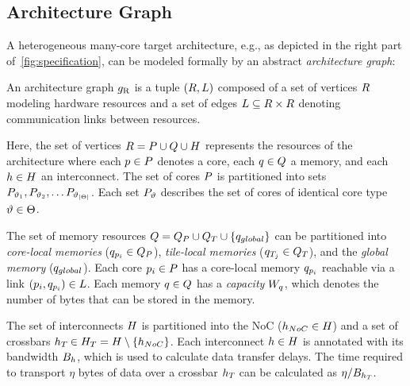 \subsection{Architecture Graph}\label{sec:architecture}
A heterogeneous many-core target architecture, e.g., as depicted in the right part of~\cref{fig:specification}, can be modeled formally by an abstract \emph{architecture graph}:
\begin{definition}\label{def:architecture}
An architecture graph $g_\textrm{R}$ is a tuple $(R, L)$ composed of a set of vertices $R$ modeling hardware resources and a set of edges $L \subseteq R \times R$ denoting communication links between resources. 
\end{definition}
\par
Here, the set of vertices $R = P \cup Q \cup H$ represents the resources of the architecture where each $p \in P$ denotes a core, each $q \in Q$ a memory, and each $h \in H$ an interconnect.
The set of cores $P$ is partitioned into sets $P_{\vartheta_1}, P_{\vartheta_2}, \ldots P_{\vartheta_{|\Theta|}}$.
Each set $P_\vartheta$ describes the set of cores of identical core type $\vartheta \in \Theta$.
\par
The set of memory resources $Q = Q_P \cup Q_T \cup \{q_{global}\}$ can be partitioned into \emph{core-local memories} ($q_{p_i} \in Q_P$), \emph{tile-local memories} ($q_{T_j} \in Q_T$), and the \emph{global memory} ($q_{global}$).
Each core $p_i \in P$ has a core-local memory $q_{p_i}$ reachable via a link $(p_i,q_{p_i}) \in L$.
Each memory $q \in Q$ has a \emph{capacity} $W_{q}$, which denotes the number of bytes that can be stored in the memory.
\par
The set of interconnects $H$ is partitioned into the \ac{NoC} ($h_{NoC} \in H$) and a set of crossbars ${h_{T_{}}} \in H_T = H \setminus \{h_{NoC}\}$.
Each interconnect $h \in H$ is annotated with its bandwidth $B_{h}$, which is used to calculate data transfer delays.
The time required to transport $\eta$ bytes of data over a crossbar ${h_{T_{}}}$ can be calculated as $\eta / B_{{h_{T_{}}}}$.
